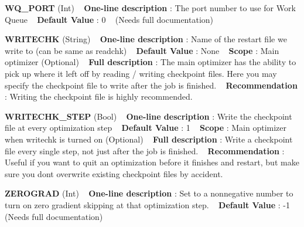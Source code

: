 \begin{DoxyItemize}
\item {\bfseries  W\+Q\+\_\+\+P\+O\+RT } (Int) ~\newline
{\bfseries  One-\/line description }\+: The port number to use for Work Queue ~\newline
{\bfseries  Default Value }\+: 0 ~\newline
(Needs full documentation)\end{DoxyItemize}
\begin{DoxyItemize}
\item {\bfseries  W\+R\+I\+T\+E\+C\+HK } (String) ~\newline
{\bfseries  One-\/line description }\+: Name of the restart file we write to (can be same as readchk) ~\newline
{\bfseries  Default Value }\+: None ~\newline
{\bfseries  Scope }\+: Main optimizer (Optional) ~\newline
{\bfseries  Full description }\+: The main optimizer has the ability to pick up where it left off by reading / writing checkpoint files. Here you may specify the checkpoint file to write after the job is finished. ~\newline
{\bfseries  Recommendation }\+: Writing the checkpoint file is highly recommended.\end{DoxyItemize}
\begin{DoxyItemize}
\item {\bfseries  W\+R\+I\+T\+E\+C\+H\+K\+\_\+\+S\+T\+EP } (Bool) ~\newline
{\bfseries  One-\/line description }\+: Write the checkpoint file at every optimization step ~\newline
{\bfseries  Default Value }\+: 1 ~\newline
{\bfseries  Scope }\+: Main optimizer when \textquotesingle{}writechk\textquotesingle{} is turned on (Optional) ~\newline
{\bfseries  Full description }\+: Write a checkpoint file every single step, not just after the job is finished. ~\newline
{\bfseries  Recommendation }\+: Useful if you want to quit an optimization before it finishes and restart, but make sure you don\textquotesingle{}t overwrite existing checkpoint files by accident.\end{DoxyItemize}
\begin{DoxyItemize}
\item {\bfseries  Z\+E\+R\+O\+G\+R\+AD } (Int) ~\newline
{\bfseries  One-\/line description }\+: Set to a nonnegative number to turn on zero gradient skipping at that optimization step. ~\newline
{\bfseries  Default Value }\+: -\/1 ~\newline
(Needs full documentation)\end{DoxyItemize}
